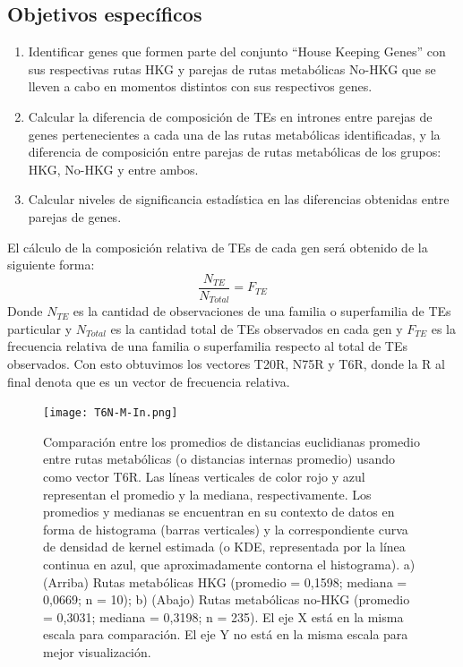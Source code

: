 \documentclass[12pt]{article}
\begin{document}
\subsection{Objetivos específicos}
\begin{enumerate}
    \item Identificar genes que formen parte del conjunto ``House Keeping Genes'' con sus respectivas rutas HKG y parejas de rutas metabólicas No-HKG que se lleven a cabo en momentos distintos con sus respectivos genes.
    \item Calcular la diferencia de composición de TEs en intrones entre parejas de genes pertenecientes a cada una de las rutas metabólicas identificadas, y la diferencia de composición entre parejas de rutas metabólicas de los grupos: HKG, No-HKG y entre ambos.
    \item Calcular niveles de significancia estadística en las diferencias obtenidas entre parejas de genes.
\end{enumerate}
\newpage
El cálculo de la composición relativa de TEs de cada gen será obtenido de la siguiente forma:
\begin{equation}
    \frac{N_{TE}}{N_{Total}} = F_{TE}
    \label{eq:freqRelativa}
\end{equation}
Donde $N_{TE}$ es la cantidad de observaciones de una familia o superfamilia de TEs particular y $N_{Total}$ es la cantidad total de TEs observados en cada gen y $F_{TE}$ es la frecuencia relativa de una familia o superfamilia respecto al total de TEs observados. Con esto obtuvimos los vectores T20R, N75R y T6R, donde la R al final denota que es un vector de frecuencia relativa.

\begin{figure}[ht!]
    \centering
    \small
    \vspace*{-10mm}
    \texttt{[image: T6N-M-In.png]}
    \caption{Comparación entre los promedios de distancias euclidianas promedio entre rutas metabólicas (o distancias internas promedio) usando como vector T6R. Las líneas verticales de color rojo y azul representan el promedio y la mediana, respectivamente. Los promedios y medianas se encuentran en su contexto de datos en forma de histograma (barras verticales) y la correspondiente curva de densidad de kernel estimada (o KDE, representada por la línea continua en azul, que aproximadamente contorna el histograma). a) (Arriba) Rutas metabólicas HKG (promedio = 0,1598; mediana = 0,0669; n = 10); b) (Abajo) Rutas metabólicas no-HKG (promedio = 0,3031; mediana = 0,3198; n = 235). El eje X está en la misma escala para comparación. El eje Y no está en la misma escala para mejor visualización.}
    \label{T6R-M-In}
\end{figure}
\end{document}
